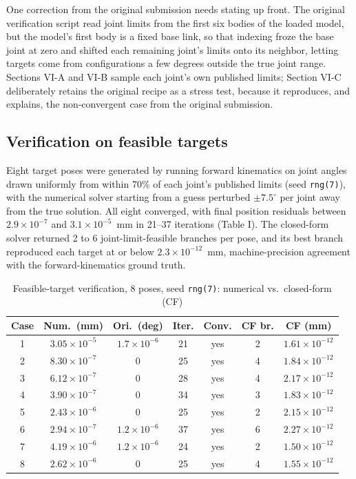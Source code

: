 \documentclass[conference]{IEEEtran}
\begin{document}
One correction from the original submission needs stating up front. The original verification script read joint limits from the first six bodies of the loaded model, but the model's first body is a fixed base link, so that indexing froze the base joint at zero and shifted each remaining joint's limits onto its neighbor, letting targets come from configurations a few degrees outside the true joint range. Sections VI-A and VI-B sample each joint's own published limits; Section VI-C deliberately retains the original recipe as a stress test, because it reproduces, and explains, the non-convergent case from the original submission.

\subsection{Verification on feasible targets}
\label{sec:feasible}
Eight target poses were generated by running forward kinematics on joint angles drawn uniformly from within 70\% of each joint's published limits (seed \texttt{rng(7)}), with the numerical solver starting from a guess perturbed $\pm 7.5^\circ$ per joint away from the true solution. All eight converged, with final position residuals between $2.9\times10^{-7}$ and $3.1\times10^{-5}$~mm in 21--37 iterations (Table I). The closed-form solver returned 2 to 6 joint-limit-feasible branches per pose, and its best branch reproduced each target at or below $2.3\times10^{-12}$~mm, machine-precision agreement with the forward-kinematics ground truth.

\begin{table}[t]
\caption{Feasible-target verification, 8 poses, seed \texttt{rng(7)}: numerical vs.\ closed-form (CF)}
\label{tab:ikresults}
\centering
\scriptsize
\setlength{\tabcolsep}{2pt}
\begin{tabular}{ccccccc}
\hline
Case & Num.\ (mm) & Ori.\ (deg) & Iter. & Conv. & CF br. & CF (mm) \\
\hline
1 & $3.05\times10^{-5}$ & $1.7\times10^{-6}$ & 21 & yes & 2 & $1.61\times10^{-12}$ \\
2 & $8.30\times10^{-7}$ & 0 & 25 & yes & 4 & $1.84\times10^{-12}$ \\
3 & $6.12\times10^{-7}$ & 0 & 28 & yes & 4 & $2.17\times10^{-12}$ \\
4 & $3.90\times10^{-7}$ & 0 & 34 & yes & 3 & $1.83\times10^{-12}$ \\
5 & $2.43\times10^{-6}$ & 0 & 25 & yes & 2 & $2.15\times10^{-12}$ \\
6 & $2.94\times10^{-7}$ & $1.2\times10^{-6}$ & 37 & yes & 6 & $2.27\times10^{-12}$ \\
7 & $4.19\times10^{-6}$ & $1.2\times10^{-6}$ & 24 & yes & 2 & $1.50\times10^{-12}$ \\
8 & $2.62\times10^{-6}$ & 0 & 25 & yes & 4 & $1.55\times10^{-12}$ \\
\hline
\end{tabular}
\end{table}
\end{document}
